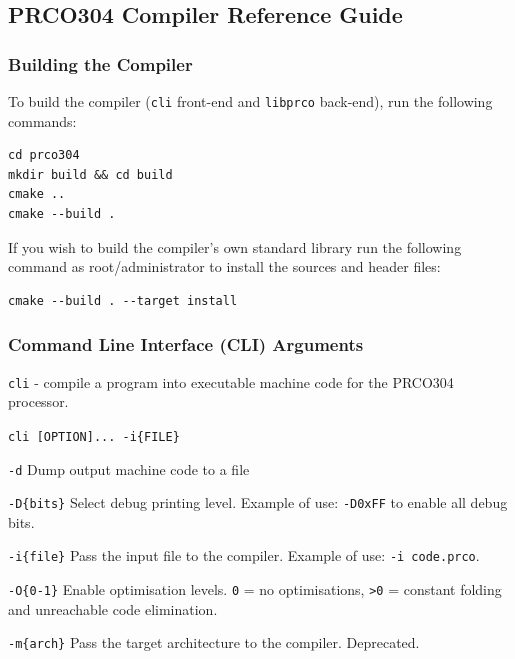 \documentclass[11pt,a4paper]{report}
\newcommand{\scname}{PRCO304}
\begin{document}
\subsection{\scname{} Compiler Reference Guide}
\subsubsection*{Building the Compiler}
To build the compiler (\verb|cli| front-end and \verb|libprco| back-end), run the following commands:
\begin{verbatim}
cd prco304
mkdir build && cd build
cmake ..
cmake --build .
\end{verbatim}
If you wish to build the compiler's own standard library run the following command as root/administrator to install the sources and header files:
\begin{verbatim}
cmake --build . --target install
\end{verbatim}

\subsubsection*{Command Line Interface (CLI) Arguments}
\label{sect:compiler_cli}
\begin{description}[style=nextline]
\item [Name]
\verb|cli| - compile a program into executable machine code for the \scname{} processor.

\item[Synopsis]
\verb|cli [OPTION]... -i{FILE}|

\item [Description]
\verb|-d| Dump output machine code to a file

\verb|-D{bits}| Select debug printing level. Example of use: \verb|-D0xFF| to enable all debug bits. 

\verb|-i{file}| Pass the input file to the compiler. Example of use: \verb|-i code.prco|.

\verb|-O{0-1}| Enable optimisation levels. \verb|0| = no optimisations, \verb|>0| = constant folding and unreachable code elimination.

\verb|-m{arch}| Pass the target architecture to the compiler. Deprecated.

\end{description}
\end{document}
